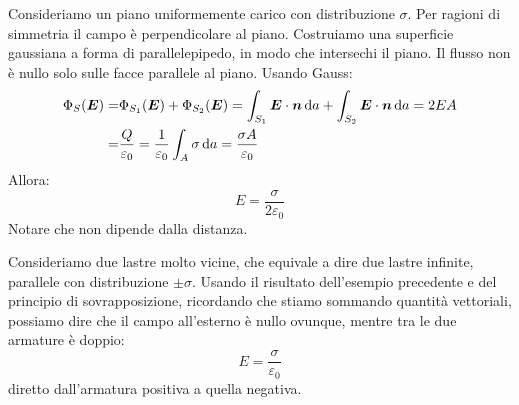 \begin{Es}[Piano]
Consideriamo un piano uniformemente carico con distribuzione $\sigma$. Per ragioni di simmetria il campo è perpendicolare al piano. Costruiamo una superficie gaussiana a forma di parallelepipedo, in modo che intersechi il piano. Il flusso non è nullo solo sulle facce parallele al piano. Usando Gauss:
\begin{align*}
\Phi_S(\boldsymbol{E})=&\Phi_{S_1}(\boldsymbol{E})+\Phi_{S_2}(\boldsymbol{E})=\int_{S_1}\boldsymbol{E}\cdot\boldsymbol{n}\,\mathrm{d} a+\int_{S_2}\boldsymbol{E}\cdot\boldsymbol{n}\,\mathrm{d} a=2EA\\
=&\frac{Q}{\varepsilon_0}=\frac{1}{\varepsilon_0}\int_A \sigma\,\mathrm{d} a=\frac{\sigma A}{\varepsilon_0}
\end{align*}
Allora:
\begin{equation*}E=\frac{\sigma}{2\varepsilon_0}\end{equation*}
Notare che non dipende dalla distanza.
\end{Es}
\begin{Es}
Consideriamo due lastre molto vicine, che equivale a dire due lastre infinite, parallele con distribuzione $\pm\sigma$. Usando il risultato dell'esempio precedente e del principio di sovrapposizione, ricordando che stiamo sommando quantità vettoriali, possiamo dire che il campo all'esterno è nullo ovunque, mentre tra le due armature è doppio:
\begin{equation*}E=\frac{\sigma}{\varepsilon_0}\end{equation*}
diretto dall'armatura positiva a quella negativa.
\end{Es}
